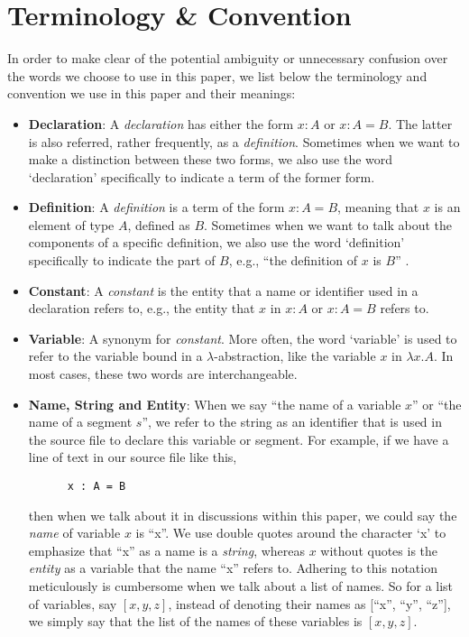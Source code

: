 \chapter{Terminology \& Convention}\label{chapter:term}
In order to make clear of the potential ambiguity or unnecessary confusion over the words we choose to use in this paper, we list below the terminology and convention we use in this paper and their meanings:
\begin{itemize}
  \item \textbf{Declaration}: A \emph{declaration} has either the form $x : A$ or $x : A = B$. The latter is also referred, rather frequently, as a \emph{definition}. Sometimes when we want to make a distinction between these two forms, we also use the word `declaration' specifically to indicate a term of the former form. 
  \item \textbf{Definition}: A \emph{definition} is a term of the form $x : A = B$, meaning that $x$ is an element of type $A$, defined as $B$. Sometimes when we want to talk about the components of a specific definition, we also use the word `definition' specifically to indicate the part of $B$, e.g., ``the definition of $x$ is $B$'' .  
  \item \textbf{Constant}: A \emph{constant} is the entity that a name or identifier used in a declaration refers to, e.g., the entity that $x$ in $x : A$ or $x : A = B$ refers to.
  \item \textbf{Variable}: A synonym for \emph{constant}. More often, the word `variable' is used to refer to the variable bound in a $\lambda$-abstraction, like the variable $x$ in $\lambda x . A$. In most cases, these two words are interchangeable. 
  \item \textbf{Name, String and Entity}: When we say ``the name of a variable $x$'' or ``the name of a segment $s$'', we refer to the string as an identifier that is used in the source file to declare this variable or segment. For example, if we have a line of text in our source file like this,
    \begin{lstlisting}
      x : A = B
    \end{lstlisting}
    then when we talk about it in discussions within this paper, we could say the \emph{name} of variable $x$ is ``x''. We use double quotes around the character `x' to emphasize that ``x'' as a name is a \emph{string}, whereas $x$ without quotes is the \emph{entity} as a variable that the name ``x'' refers to. Adhering to this notation meticulously is cumbersome when we talk about a list of names. So for a list of variables, say $[x,y,z]$, instead of denoting their names as [``x'', ``y'', ``z''], we simply say that the list of the names of these variables is $[x,y,z]$. 
\end{itemize}
